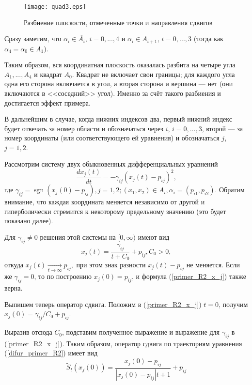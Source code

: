 \begin{figure}[h]
	\centering
	\texttt{[image: quad3.eps]}
	\caption{Разбиение плоскости, отмеченные точки и направления сдвигов}
	\label{fig:somelabel}
\end{figure}

Сразу заметим, что $\alpha_i \in \overline{A_i}$, $i=0,...,4$ и
$\alpha_i \in A_{i+1}$, $i=0,...,3$ (тогда как $\alpha_4 = \alpha_0 \in A_{1}$).

Таким образом, вся координатная плоскость оказалась разбита на четыре угла $A_1, ..., A_4$ и квадрат $A_0$.
Квадрат не включает свои границы; для каждого угла одна его сторона включается в угол,
а вторая сторона и вершина --- нет (они включаются в <<соседний>> угол).
Именно за счёт такого разбиения и достигается эффект примера.

В дальнейшим в случае, когда нижних индексов два, первый нижний индекс
будет отвечать за номер области и обозначаться через $i$,
$i=0, ..., 3$, второй --- за номер координаты
(или соответствующего ей уравнения) и обозначаться $j$, $j=1, 2$.

Рассмотрим систему двух обыкновенных дифференциальных уравнений
\begin{equation}\label{difur_primer_R2}
	\frac{dx_j(t)}{dt} = -\gamma_{ij}(x_j(t)-p_{ij})^2,
\end{equation}
где
$
	\gamma_{ij} = \operatorname{sgn}(x_j(0)-p_{ij}), j=1,2;
	(x_1, x_2) \in A_i,  \alpha_i = (p_{i1},p_{i2}).
$
Обратим внимание, что каждая координата меняется независимо от другой и гиперболически стремится
к некоторому предельному значению (это будет показано далее).

Для $\gamma_{ij} \neq 0$ решения этой системы на $[0, \infty)$ имеют вид
\begin{equation}\label{primer_R2_x_j}
	x_j(t) = \frac{\gamma_{ij}}{t+C_0}+p_{ij}, C_0 > 0,
\end{equation}
откуда
$
	x_j(t) \xrightarrow[t\to \infty ]{}{p_{ij}},
$
при этом знак разности $x_j(t) - p_{ij}$ не меняется.
Если же $\gamma_{ij}=0$, то по построению $x_j(0)=p_{ij}$,
и формула (\ref{primer_R2_x_j}) также верна.

Выпишем теперь оператор сдвига.
Положим в (\ref{primer_R2_x_j}) $t=0$, получим
$
	x_j(0) = \gamma_{ij}/{C_0}+p_{ij}
$.

Выразив отсюда $C_0$, подставим полученное выражение и выражение для $\gamma_{ij}$ в (\ref{primer_R2_x_j}).
Таким образом, оператор сдвига по траекториям уравнения (\ref{difur_primer_R2}) имеет вид
\begin{equation}\label{primer_R2_oper_sdviga}
	\tilde{S}_t(x_{j}(0)) = \frac{x_{j}(0)-p_{ij}}{|x_{j}(0)-p_{ij}|t+1}+p_{ij}
\end{equation}

